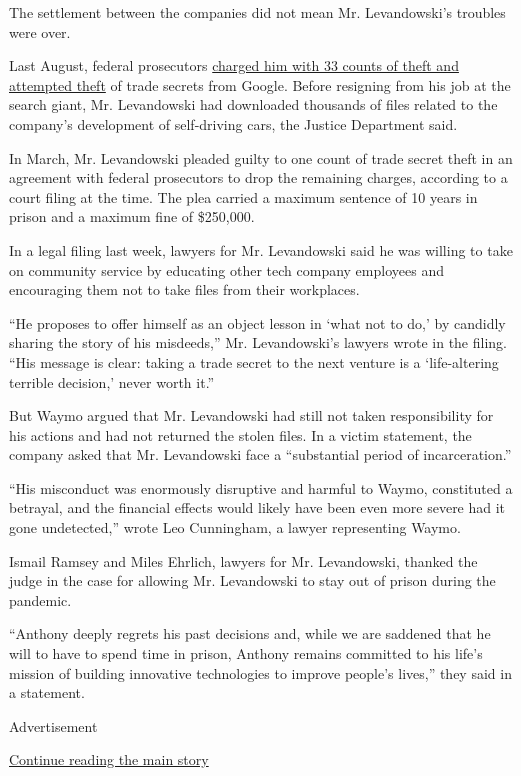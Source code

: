 The settlement between the companies did not mean Mr. Levandowski's
troubles were over.

Last August, federal prosecutors
\href{https://www.nytimes.com/2019/08/27/technology/google-trade-secrets-levandowski.html}{charged
him with 33 counts of theft and attempted theft} of trade secrets from
Google. Before resigning from his job at the search giant, Mr.
Levandowski had downloaded thousands of files related to the company's
development of self-driving cars, the Justice Department said.

In March, Mr. Levandowski pleaded guilty to one count of trade secret
theft in an agreement with federal prosecutors to drop the remaining
charges, according to a court filing at the time. The plea carried a
maximum sentence of 10 years in prison and a maximum fine of \$250,000.

In a legal filing last week, lawyers for Mr. Levandowski said he was
willing to take on community service by educating other tech company
employees and encouraging them not to take files from their workplaces.

``He proposes to offer himself as an object lesson in `what not to do,'
by candidly sharing the story of his misdeeds,'' Mr. Levandowski's
lawyers wrote in the filing. ``His message is clear: taking a trade
secret to the next venture is a `life-altering terrible decision,' never
worth it.''

But Waymo argued that Mr. Levandowski had still not taken responsibility
for his actions and had not returned the stolen files. In a victim
statement, the company asked that Mr. Levandowski face a ``substantial
period of incarceration.''

``His misconduct was enormously disruptive and harmful to Waymo,
constituted a betrayal, and the financial effects would likely have been
even more severe had it gone undetected,'' wrote Leo Cunningham, a
lawyer representing Waymo.

Ismail Ramsey and Miles Ehrlich, lawyers for Mr. Levandowski, thanked
the judge in the case for allowing Mr. Levandowski to stay out of prison
during the pandemic.

``Anthony deeply regrets his past decisions and, while we are saddened
that he will to have to spend time in prison, Anthony remains committed
to his life's mission of building innovative technologies to improve
people's lives,'' they said in a statement.

Advertisement

\protect\hyperlink{after-bottom}{Continue reading the main story}

